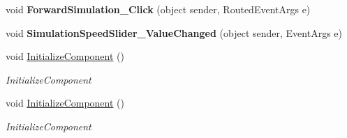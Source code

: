 \begin{DoxyCompactItemize}
\item 
void {\bfseries Forward\+Simulation\+\_\+\+Click} (object sender, Routed\+Event\+Args e)\hypertarget{class_hi_co_simulator_1_1_main_window_a75e1bf849c13559816b9a87735ea2ca5}{}\label{class_hi_co_simulator_1_1_main_window_a75e1bf849c13559816b9a87735ea2ca5}

\item 
void {\bfseries Simulation\+Speed\+Slider\+\_\+\+Value\+Changed} (object sender, Event\+Args e)\hypertarget{class_hi_co_simulator_1_1_main_window_a1148deefd820d8c9b93a079c587a4a1b}{}\label{class_hi_co_simulator_1_1_main_window_a1148deefd820d8c9b93a079c587a4a1b}

\item 
void \hyperlink{class_hi_co_simulator_1_1_main_window_a87fd6a9a28cffdbf4d2243da7dc43352}{Initialize\+Component} ()
\begin{DoxyCompactList}\small\item\em Initialize\+Component \end{DoxyCompactList}\item 
void \hyperlink{class_hi_co_simulator_1_1_main_window_a87fd6a9a28cffdbf4d2243da7dc43352}{Initialize\+Component} ()
\begin{DoxyCompactList}\small\item\em Initialize\+Component \end{DoxyCompactList}\end{DoxyCompactItemize}

